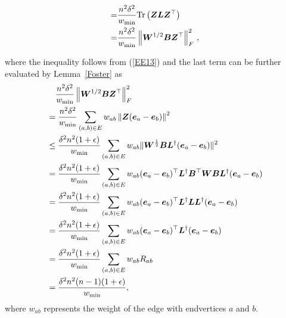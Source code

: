 \documentclass[10pt,twocolumn,twoside]{IEEEtran}
\begin{document}
\begin{IEEEproof}
\begin{small}
\begin{align*}
            =   & \frac{n^2\delta^2}{w_{\min}}  \mathrm{Tr}\left(\boldsymbol{Z}\boldsymbol{L}\boldsymbol{Z}^{\top}\right)                                         \\
            =   & \frac{n^2\delta^{2}}{w_{\min}} \left\Vert\boldsymbol{W}^{1/2} \boldsymbol{B} \boldsymbol{Z}^{\top}\right\Vert_{F}^{2}\,,
        \end{align*}
    \end{small}
    where the  inequality follows from (\ref{EE13}) and the last term can be further evaluated by Lemma~\ref {Foster} as
    \begin{align*}
         & \quad \frac{n^2\delta^2}{w_{\min}} \left\Vert\boldsymbol{W}^{1/2} \boldsymbol{B} \boldsymbol{Z}^{\top}\right\Vert_{F}^{2}                                           \\
         & =\frac{n^2\delta^{2}}{w_{\min}}
        \sum_{\left( a,b \right) \in E} w_{ab} \left\Vert\boldsymbol{Z} (\boldsymbol{e}_{a} - \boldsymbol{e}_{b})\right\Vert^{2}                                                      \\
         & \leq
        \frac{\delta^{2}n^2 (1+\epsilon)}{w_{\min}}
        \sum_{\left( a,b \right) \in E} w_{ab}\|\boldsymbol{W}^{\frac{1}{2}} \boldsymbol{B} \boldsymbol{L}^{\dagger} (\boldsymbol{e}_a-\boldsymbol{e}_b)\|^2                              \\
         & =
        \frac{\delta^{2}n^2 (1+\epsilon)}{w_{\min}}
        \sum_{\left( a,b \right) \in E} w_{ab}(\boldsymbol{e}_a-\boldsymbol{e}_b)^\top \boldsymbol{L}^{\dagger} \boldsymbol{B}^\top \boldsymbol{W} \boldsymbol{B} \boldsymbol{L}^{\dagger} (\boldsymbol{e}_a-\boldsymbol{e}_b) \\
         & =
        \frac{\delta^{2}n^2 (1+\epsilon)}{w_{\min}}
        \sum_{\left( a,b \right) \in E} w_{ab}(\boldsymbol{e}_a-\boldsymbol{e}_b)^\top \boldsymbol{L}^{\dagger} \boldsymbol{L} \boldsymbol{L}^{\dagger} (\boldsymbol{e}_a-\boldsymbol{e}_b)                   \\
         & =
        \frac{\delta^{2}n^2 (1+\epsilon)}{w_{\min}}
        \sum_{\left( a,b \right) \in E} w_{ab}(\boldsymbol{e}_a-\boldsymbol{e}_b)^\top \boldsymbol{L}^{\dagger} (\boldsymbol{e}_a-\boldsymbol{e}_b)                                       \\
         & =
        \frac{\delta^{2} n^2 (1+\epsilon)}{w_{\min}}
        \sum_{\left( a,b \right) \in E} w_{ab} R_{ab}                                                                                       \\
         & =\frac{\delta^{2} n^2(n-1) (1+\epsilon)}{w_{\min}},
    \end{align*}
    where $w_{ab}$ represents the weight of the edge with endvertices $a$ and $b$.


\end{IEEEproof}
\end{document}
